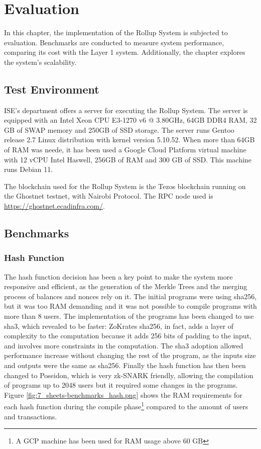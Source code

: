 \chapter{Evaluation\label{cha:chapter7}}

In this chapter, the implementation of the Rollup System is subjected to evaluation. Benchmarks are conducted to measure system performance, comparing its cost with the Layer 1 system. Additionally, the chapter explores the system's scalability.



\section{Test Environment\label{sec:testenvir}}

ISE's department offers a server for executing the Rollup System. The server is equipped with an Intel Xeon CPU E3-1270 v6 @ 3.80GHz, 64GB DDR4 RAM, 32 GB of SWAP memory and 250GB of SSD storage. The server runs Gentoo release 2.7 Linux distribution with kernel version 5.10.52. When more than 64GB of RAM was neede, it has been used a Google Cloud Platform virtual machine with 12 vCPU Intel Haswell, 256GB of RAM and 300 GB of SSD. This machine runs Debian 11.

The blockchain used for the Rollup System is the Tezos blockchain running on the Ghostnet testnet, with Nairobi Protocol. The RPC node used is \url{https://ghostnet.ecadinfra.com/}.


\section{Benchmarks\label{sec:benchmarks}}

\subsection{Hash Function\label{subsec:6_hashfunc}}

The hash function decision has been a key point to make the system more responsive and efficient, as the generation of the Merkle Trees and the merging process of balances and nonces rely on it. The initial programs were using sha256, but it was too RAM demanding and it was not possible to compile programs with more than 8 users. The implementation of the programs has been changed to use sha3, which revealed to be faster: ZoKrates sha256, in fact, adds a layer of complexity to the computation because it adds 256 bits of padding to the input, and involves more constraints in the computation. The sha3 adoption allowed performance increase without changing the rest of the program, as the inputs size and outputs were the same as sha256.
Finally the hash function has then been changed to Poseidon, which is very zk-SNARK friendly, allowing the compilation of programs up to 2048 users but it required some changes in the programs. Figure \ref{fig:7_sheets-benchmarks_hash.png} shows the RAM requirements for each hash function during the compile phase\footnote{A GCP machine has been used for RAM usage above 60 GB} compared to the amount of users and transactions.

